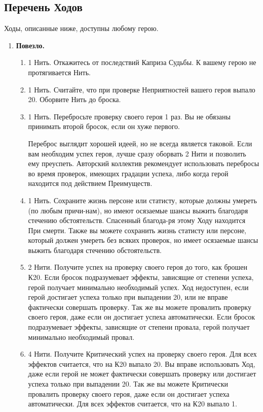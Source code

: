 \subsection{Перечень Ходов}
Ходы, описанные ниже, доступны любому герою. 
\begin{enumerate}
    \item \textbf{Повезло.}
    \begin{enumerate}
        \item 1 Нить. Откажитесь от последствий Каприза Судьбы. К вашему герою не протягивается Нить.
        \item 1 Нить. Считайте, что при проверке Неприятностей вашего героя выпало 20. Оборвите Нить до броска.
        \item 1 Нить. Перебросьте проверку своего героя 1 раз. Вы не обязаны принимать второй бросок, если он хуже первого.
        \begin{tcolorbox}
            Переброс выглядит хорошей идеей, но не всегда является таковой. Если вам необходим успех героя, лучше сразу оборвать 2 Нити и позволить ему преуспеть. Авторский коллектив рекомендует использовать перебросы во время проверок, имеющих градации успеха, либо когда герой находится под действием Преимуществ.
        \end{tcolorbox}
        \item 1 Нить. Сохраните жизнь персоне или статисту, которые должны умереть (по любым причи-нам), но имеют осязаемые шансы выжить благодаря стечению обстоятельств. Спасенный благода-ря этому Ходу находится При смерти.
        \newline Также вы можете сохранить жизнь статисту или персоне, который должен умереть без всяких проверок, но имеет осязаемые шансы выжить благодаря стечению обстоятельств.
        \item 2 Нити. Получите успех на проверку своего героя до того, как брошен К20. Если бросок подразумевает эффекты, зависящие от степени успеха, герой получает минимально необходимый успех. Ход недоступен, если герой достигает успеха только при выпадении 20, или не вправе фактически совершать проверку.
        \newline Так же вы можете провалить проверку своего героя, даже если он достигает успеха автоматически. Если бросок подразумевает эффекты, зависящие от степени провала, герой получает минимально необходимый провал.
        \item 4 Нити. Получите Критический успех на проверку своего героя. Для всех эффектов считается, что на К20 выпало 20. Вы вправе использовать Ход, даже если герой не может фактически совершать проверку или достигает успеха только при выпадении 20.
        \newline Так же вы можете Критически провалить проверку своего героя, даже если он достигает успеха автоматически. Для всех эффектов считается, что на К20 выпало 1.
    \end{enumerate}


\end{enumerate}
